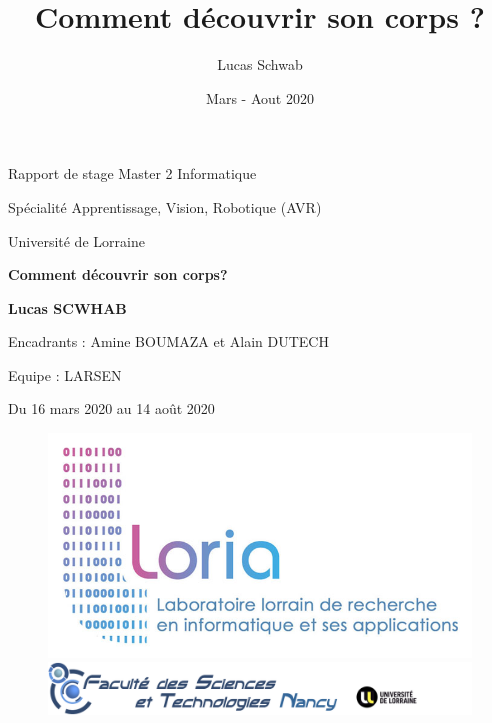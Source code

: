 \documentclass[11pt,french]{report}
\title{Comment découvrir son corps ?}
\author{Lucas Schwab}
\date{Mars - Aout 2020}
\begin{document}

\begin{titlepage}
    \begin{center}
        \vspace*{1cm}
            
        \vspace{0.5cm}
        \Large
        Rapport de stage Master 2 Informatique

        Spécialité Apprentissage, Vision, Robotique (AVR)

        Université de Lorraine

        \vspace{1cm}
        \Huge
        \textbf{Comment découvrir son corps?}


        \vspace{1.5cm}
        \Large
        \textbf{Lucas SCWHAB}
            
        \vfill
        
        \vspace{0.8cm}
            
        \Large
        Encadrants : 
        Amine BOUMAZA et Alain DUTECH
        
        Equipe : 
        LARSEN
        
        Du 16 mars 2020 au 14 août 2020
        
        \vspace{0.5cm}
        
        \begin{figure}
            \includegraphics[scale = 0.15]{logo_loria_complet.jpg}
            \includegraphics[scale = 0.32]{logo-fst-haut.png}
        \end{figure}
            
    \end{center}
\end{titlepage}
\end{document}
